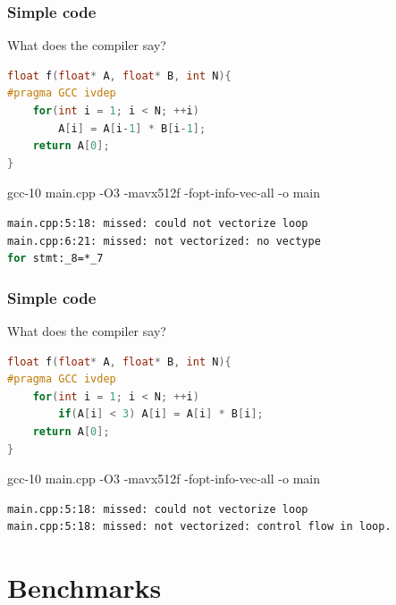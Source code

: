 \documentclass{beamer}
\begin{document}
\begin{frame}[fragile]
\frametitle{Simple code}
\begin{block}{What does the compiler say?}
\begin{lstlisting}[language=C++, caption={Vectorization example}]
float f(float* A, float* B, int N){
#pragma GCC ivdep
    for(int i = 1; i < N; ++i)
        A[i] = A[i-1] * B[i-1];
    return A[0];
}
\end{lstlisting}
\end{block}
gcc-10 main.cpp -O3 -mavx512f -fopt-info-vec-all -o main\\
\pause
\footnotesize \begin{lstlisting}[language=bash]
main.cpp:5:18: missed: could not vectorize loop
main.cpp:6:21: missed: not vectorized: no vectype 
for stmt:_8=*_7
\end{lstlisting}
\end{frame}

\begin{frame}[fragile]
\frametitle{Simple code}
\begin{block}{What does the compiler say?}
\begin{lstlisting}[language=C++, caption={Vectorization example}]
float f(float* A, float* B, int N){
#pragma GCC ivdep
    for(int i = 1; i < N; ++i)
        if(A[i] < 3) A[i] = A[i] * B[i];
    return A[0];
}
\end{lstlisting}
\end{block}
gcc-10 main.cpp -O3 -mavx512f -fopt-info-vec-all -o main\\
\pause
\footnotesize \begin{lstlisting}[language=bash]
main.cpp:5:18: missed: could not vectorize loop
main.cpp:5:18: missed: not vectorized: control flow in loop.
\end{lstlisting}
\end{frame}


\section{Benchmarks}
\end{document}
